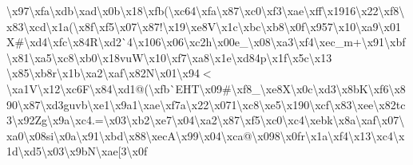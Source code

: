 \textbackslash{}x97\textbackslash{}xfa\textbackslash{}xdb\textbackslash{}xad\textbackslash{}x0b\textbackslash{}x18\textbackslash{}xfb(\textbackslash{}xc64\textbackslash{}xfa\textbackslash{}x87\textbackslash{}xc0\textbackslash{}xf3\textbackslash{}xae\textbackslash{}xff\textbackslash{}x1916\textbackslash{}x22\textbackslash{}xf8\textbackslash{}x83\textbackslash{}xcd\textbackslash{}x1a(\textbackslash{}x8f\textbackslash{}xf5\textbackslash{}x07\textbackslash{}x87!\textbackslash{}x19\textbackslash{}xe8\+V\textbackslash{}x1c\textbackslash{}xbc\textbackslash{}xb8\textbackslash{}x0f\textbackslash{}x957\textbackslash{}x10\textbackslash{}xa9\textbackslash{}x01\+X\#\textbackslash{}xd4\textbackslash{}xfc\textbackslash{}x84\+R\textbackslash{}xd2\`{}4\textbackslash{}x106\textbackslash{}x06\textbackslash{}xc2h\textbackslash{}x00e\+\_\+\textbackslash{}x08\textbackslash{}xa3\textbackslash{}xf4\textbackslash{}xec\+\_\+m+\textbackslash{}x91\textbackslash{}xbf\textbackslash{}x81\textbackslash{}xa5\textbackslash{}xc8\textbackslash{}xb0\textbackslash{}x18vu\+W\textbackslash{}x10\textbackslash{}xf7\textbackslash{}xa8\textbackslash{}x1e\textbackslash{}xd84p\textbackslash{}x1f\textbackslash{}x5c\textbackslash{}x13 \textbackslash{}x85\textbackslash{}xb8r\textbackslash{}x1b\textbackslash{}xa2\textbackslash{}xaf\textbackslash{}x82\+N\textbackslash{}x01\textbackslash{}x94$<$\textbackslash{}xa1\+V\textbackslash{}x12\textbackslash{}xc6\+F\textbackslash{}x84\textbackslash{}xd1@(\textbackslash{}xfb\`{}\+E\+H\+T\textbackslash{}x09\#\textbackslash{}xf8\+\_\+\textbackslash{}xe8\+X\textbackslash{}x0c\textbackslash{}xd3\textbackslash{}x8b\+K\textbackslash{}xf6\textbackslash{}x890\textbackslash{}x87\textbackslash{}xd3guvb\textbackslash{}xe1\textbackslash{}x9a1\textbackslash{}xae\textbackslash{}xf7a\textbackslash{}x22\textbackslash{}x071\textbackslash{}xc8\textbackslash{}xe5\textbackslash{}x190\textbackslash{}xcf\textbackslash{}x83\textbackslash{}xee\textbackslash{}x82tc3\textbackslash{}x92\+Zg\textbackslash{}x9a\textbackslash{}xc4.=\textbackslash{}x03\textbackslash{}xb2\textbackslash{}xe7\textbackslash{}x04\textbackslash{}xa2\textbackslash{}x87\textbackslash{}xf5\textbackslash{}xc0\textbackslash{}xc4\textbackslash{}xebk\textbackslash{}x8a\textbackslash{}xaf\textbackslash{}x07\textbackslash{}xa0\textbackslash{}x08si\textbackslash{}x0a\textbackslash{}x91\textbackslash{}xbd\textbackslash{}x88\textbackslash{}xec\+A\textbackslash{}x99\textbackslash{}x04\textbackslash{}xca@\textbackslash{}x098\textbackslash{}x0fr\textbackslash{}x1a\textbackslash{}xf4\textbackslash{}x13\textbackslash{}xc4\textbackslash{}x1d\textbackslash{}xd5\textbackslash{}x03\textbackslash{}x9b\+N\textbackslash{}xae\mbox{[}3\textbackslash{}x0f 